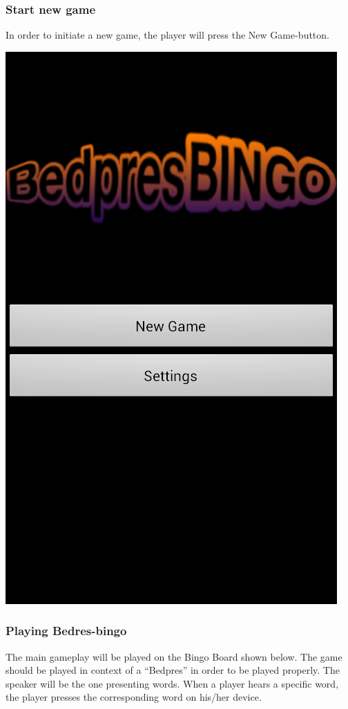 \subsubsection{Start new game}
In order to initiate a new game, the player will press the New Game-button.
\begin{center}
\includegraphics[scale=0.5]{Pikks/Mainmenu}
\end{center}

\subsubsection{Playing Bedres-bingo}
The main gameplay will be played on the Bingo Board shown below. The game
should be played in context of a ``Bedpres'' in order to be played properly.
The speaker will be the one presenting words. When a player hears a specific
word, the player presses the corresponding word on his/her device.

